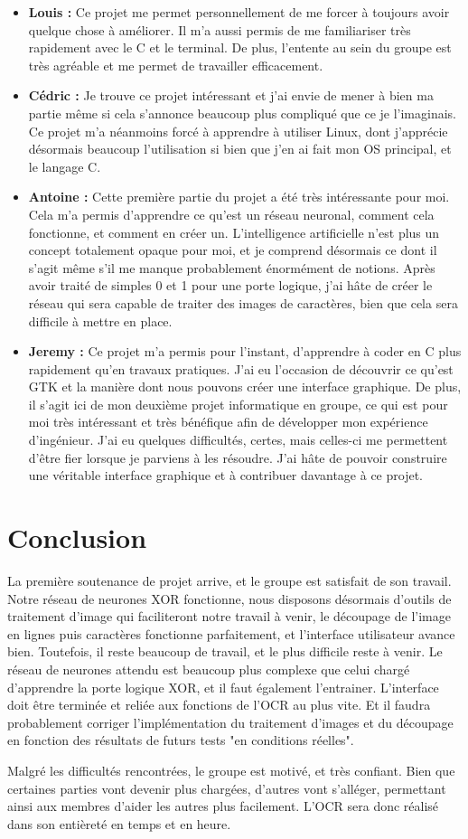 \documentclass[12pt]{report}
\begin{document}
\begin{itemize}
	\item \textbf{Louis :} Ce projet me permet personnellement de me forcer à toujours avoir quelque chose à améliorer. Il m’a aussi permis de me familiariser très rapidement avec le C et le terminal. De plus, l’entente au sein du groupe est très agréable et me permet de travailler efficacement.
	\item \textbf{Cédric :} Je trouve ce projet intéressant et j'ai envie de mener à bien ma partie même si cela s'annonce beaucoup plus compliqué que ce je l'imaginais. Ce projet m'a néanmoins forcé à apprendre à utiliser Linux, dont j'apprécie désormais beaucoup l'utilisation si bien que j'en ai fait mon OS principal, et le langage C.
	\item \textbf{Antoine :} Cette première partie du projet a été très intéressante pour moi. Cela m'a permis d'apprendre ce qu'est un réseau neuronal, comment cela fonctionne, et comment en créer un. L'intelligence artificielle n'est plus un concept totalement opaque pour moi, et je comprend désormais ce dont il s'agit même s'il me manque probablement énormément de notions. Après avoir traité de simples 0 et 1 pour une porte logique, j'ai hâte de créer le réseau qui sera capable de traiter des images de caractères, bien que cela sera difficile à mettre en place.
	\item \textbf{Jeremy :} Ce projet m’a permis pour l’instant, d’apprendre à coder en C plus rapidement qu’en travaux pratiques. J’ai eu l’occasion de découvrir ce qu’est GTK et la manière dont nous pouvons créer une interface graphique. De plus, il s’agit ici de mon deuxième projet informatique en groupe, ce qui est pour moi très intéressant et très bénéfique afin de développer mon expérience d’ingénieur. J’ai eu quelques difficultés, certes, mais celles-ci me permettent d’être fier lorsque je parviens à les résoudre. J’ai hâte de pouvoir construire une véritable interface graphique et à contribuer davantage à ce projet.
\end{itemize}

\chapter{Conclusion}

La première soutenance de projet arrive, et le groupe est satisfait de son travail. Notre réseau de neurones XOR fonctionne, nous disposons désormais d'outils de traitement d'image qui faciliteront notre travail à venir, le découpage de l'image en lignes puis caractères fonctionne parfaitement, et l'interface utilisateur avance bien. Toutefois, il reste beaucoup de travail, et le plus difficile reste à venir. Le réseau de neurones attendu est beaucoup plus complexe que celui chargé d'apprendre la porte logique XOR, et il faut également l'entrainer. L'interface doit être terminée et reliée aux fonctions de l'OCR au plus vite. Et il faudra probablement corriger l'implémentation du traitement d'images et du découpage en fonction des résultats de futurs tests "en conditions réelles".

Malgré les difficultés rencontrées, le groupe est motivé, et très confiant. Bien que certaines parties vont devenir plus chargées, d'autres vont s'alléger, permettant ainsi aux membres d'aider les autres plus facilement. L'OCR sera donc réalisé dans son entièreté en temps et en heure.

\vfill
\end{document}
